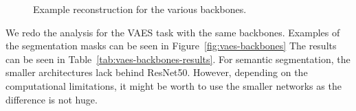 \begin{figure}[!ht]
    \centering
     \quad
    \caption{Example reconstruction for the various backbones.}
    \label{fig:vae-backbones}
\end{figure}



We redo the analysis for the VAES task with the same backbones. Examples of the segmentation masks can be seen in Figure~\ref{fig:vaes-backbones} The results can be seen in Table~\ref{tab:vaes-backbones-results}. For semantic segmentation, the smaller architectures lack behind ResNet50. However, depending on the computational limitations, it might be worth to use the smaller networks as the difference is not huge.

